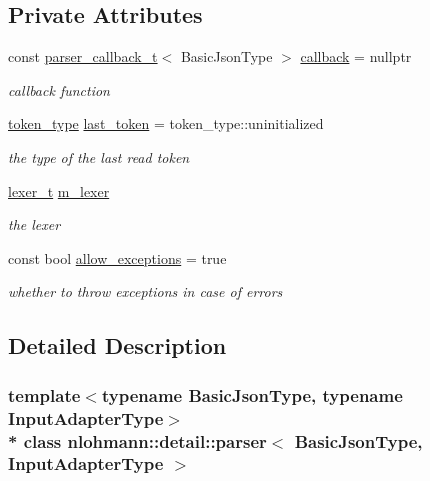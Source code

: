 \subsection*{Private Attributes}
\begin{DoxyCompactItemize}
\item 
const \hyperlink{namespacenlohmann_1_1detail_a9980144ad77e50ae944d1fe797ceec08}{parser\+\_\+callback\+\_\+t}$<$ Basic\+Json\+Type $>$ \hyperlink{classnlohmann_1_1detail_1_1parser_a6bf70a72a1632ef55c0068557b1be37a}{callback} = nullptr
\begin{DoxyCompactList}\small\item\em callback function \end{DoxyCompactList}\item 
\hyperlink{classnlohmann_1_1detail_1_1parser_a5cb5ea47f09f116e71a908c556325710}{token\+\_\+type} \hyperlink{classnlohmann_1_1detail_1_1parser_a307ed42d5f31a9c5bec991ceee87b0e7}{last\+\_\+token} = token\+\_\+type\+::uninitialized
\begin{DoxyCompactList}\small\item\em the type of the last read token \end{DoxyCompactList}\item 
\hyperlink{classnlohmann_1_1detail_1_1parser_a5fbd320c5b713fda15d467e8455e4298}{lexer\+\_\+t} \hyperlink{classnlohmann_1_1detail_1_1parser_a01a73810f794c239aaf123aa2af7371d}{m\+\_\+lexer}
\begin{DoxyCompactList}\small\item\em the lexer \end{DoxyCompactList}\item 
const bool \hyperlink{classnlohmann_1_1detail_1_1parser_ab0dbaeaa6df00631072f902068c57750}{allow\+\_\+exceptions} = true
\begin{DoxyCompactList}\small\item\em whether to throw exceptions in case of errors \end{DoxyCompactList}\end{DoxyCompactItemize}


\subsection{Detailed Description}
\subsubsection*{template$<$typename Basic\+Json\+Type, typename Input\+Adapter\+Type$>$\\*
class nlohmann\+::detail\+::parser$<$ Basic\+Json\+Type, Input\+Adapter\+Type $>$}

